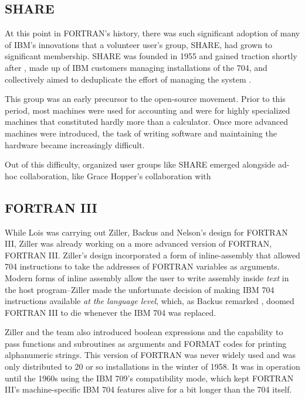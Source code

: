 \subsection{SHARE}

At this point in FORTRAN's history, there was such significant adoption of
many of IBM's innovations that a volunteer user's group, SHARE, had grown to
significant membership.
SHARE was founded in 1955 and gained traction shortly after \cite{akera_voluntarism_ibm_share_2001},
made up of IBM customers managing installations of the 704,
and collectively aimed to deduplicate the effort of managing the system
\cite{armer_share_eulogy_1980}.

This group was an early precursor to the open-source movement.
Prior to this period, most machines were used for accounting and were for
highly specialized machines that constituted hardly more than a calculator.
Once more advanced machines were introduced, the task of writing software
and maintaining the hardware became increasingly difficult.

Out of this difficulty, organized user groups like SHARE emerged alongside
ad-hoc collaboration, like Grace Hopper's collaboration with

\subsection{FORTRAN III}

While Lois was carrying out Ziller, Backus and Nelson's design for FORTRAN III,
Ziller was already working on a more advanced version of FORTRAN, FORTRAN III.
Ziller's design incorporated a form of \gls{inline-assembly} that allowed
704 instructions to take the addresses of FORTRAN variables as arguments.
Modern forms of inline assembly allow the user to write assembly inside \textit{text}
in the host program--Ziller made the unfortunate decision of making IBM 704
instructions available \textit{at the language level}, which, as Backus remarked
\cite{hopl_backus_history_of_fortran}, doomed FORTRAN III to die whenever the IBM 704
was replaced.

Ziller and the team also introduced boolean expressions and the capability to
pass functions and subroutines as arguments and FORMAT codes for printing
alphanumeric strings.
This version of FORTRAN was never widely used and was only distributed to
20 or so installations in the winter of 1958.
It was in operation until the 1960s using the IBM 709's compatibility mode,
which kept FORTRAN III's machine-specific IBM 704 features alive for a bit longer
than the 704 itself.

